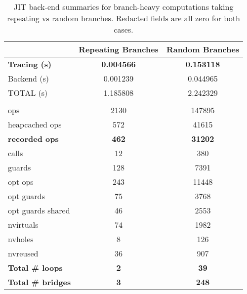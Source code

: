 			\begin{table}[!h]
			\centering
			\small
			\begin{tabular}{@{}lcc@{}}
				\toprule
				& \textbf{Repeating Branches} & \textbf{Random Branches} \\
				\midrule
				\textbf{Tracing (s)}                 & \textbf{0.004566} & \textbf{0.153118} \\
				Backend (s)                 & 0.001239 & 0.044965 \\
				TOTAL (s)                            & 1.185808 & 2.242329 \\ \\
				ops                                   & 2130 & 147895 \\
				heapcached ops                        & 572 & 41615 \\
				\textbf{recorded ops}                & \textbf{462} & \textbf{31202} \\
				\quad calls                                 & 12 & 380 \\
				guards                                & 128 & 7391 \\
				opt ops                               & 243 & 11448 \\
				opt guards                            & 75 & 3768 \\
				opt guards shared                     & 46 & 2553 \\
				nvirtuals                    & 74 & 1982 \\
				nvholes                               & 8 & 126 \\
				nvreused                              & 36 & 907 \\
				\textbf{Total \# loops}               & \textbf{2} & \textbf{39} \\
				\textbf{Total \# bridges}             & \textbf{3} & \textbf{248} \\
				\bottomrule
			\end{tabular}
			\caption{JIT back-end summaries for branch-heavy computations taking repeating vs random branches. Redacted fields are all zero for both cases.}
			\label{table:branchy-backend-summaries}
			\end{table}


